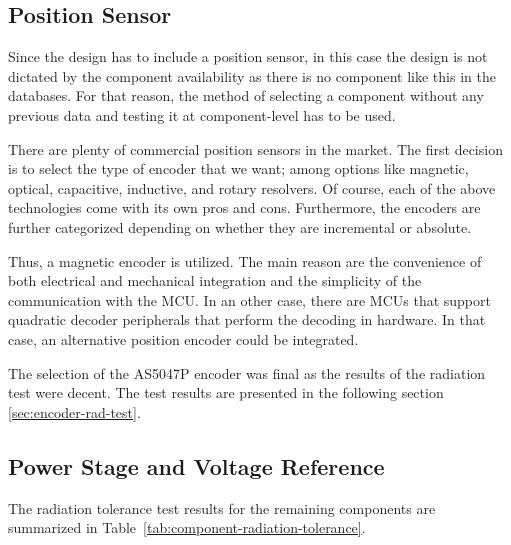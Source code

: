 \subsection{Position Sensor}
\label{subsection:encoders}
Since the design has to include a position sensor, in this case the design is not dictated by the component availability as there is no component like this in the databases. For that reason, the method of selecting a component without any previous data and testing it at component-level has to be used.

There are plenty of commercial position sensors in the market. The first decision is to select the type of encoder that we want; among options like magnetic, optical, capacitive, inductive, and rotary resolvers. Of course, each of the above technologies come with its own pros and cons. Furthermore, the encoders are further categorized depending on whether they are incremental or absolute.

Thus, a magnetic encoder is utilized. The main reason are the convenience of both electrical and mechanical integration and the simplicity of the communication with the MCU. In an other case, there are MCUs that support quadratic decoder peripherals that perform the decoding in hardware. In that case, an alternative position encoder could be integrated.

The selection of the AS5047P encoder was final as the results of the radiation test were decent. The test results are presented in the following section \ref{sec:encoder-rad-test}.

\subsection{Power Stage and Voltage Reference}
The radiation tolerance test results for the remaining components are summarized in Table~\ref{tab:component-radiation-tolerance}.

